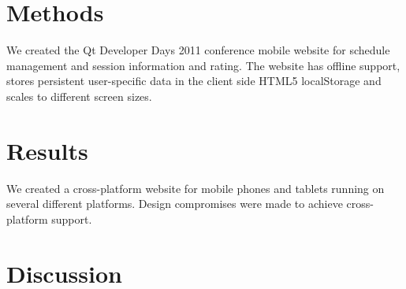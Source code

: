 \documentclass[a4paper,12pt]{article}
\begin{document}
\section{Methods}

We created the Qt Developer Days 2011 conference mobile website for
schedule management and session information and rating. The website
has offline support, stores persistent user-specific data in the
client side HTML5 localStorage and scales to different screen sizes.

\section{Results}

We created a cross-platform website for mobile phones and tablets
running on several different platforms. Design compromises were made
to achieve cross-platform support.

\section{Discussion}
\end{document}
